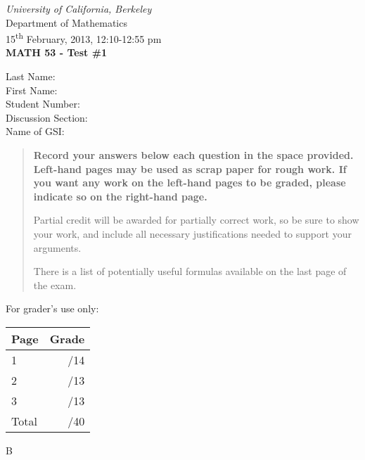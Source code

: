 \documentclass[12pt]{article}
\newcommand{\skipline}{\vspace{12pt}}
\begin{document}
\author{Instructor: Sean Fitzpatrick}
\thispagestyle{plain}
\begin{center}
\emph{University of California, Berkeley}\\
Department of Mathematics\\
15\textsuperscript{th} February, 2013, 12:10-12:55 pm\\
{\bf MATH 53 - Test \#1}\\
\end{center}
\skipline \skipline \skipline \noindent \skipline
Last Name:\underline{\hspace{350pt}}\\
\skipline
First Name:\underline{\hspace{348pt}}\\
\skipline
Student Number:\underline{\hspace{322pt}}\\
\skipline
Discussion Section: \underline{\hspace{307pt}}\\
\skipline
Name of GSI: \underline{\hspace{336pt}}\\

\vspace{0.5in}


\begin{quote}
 {\bf Record your answers below each question in the space provided.    Left-hand pages may be used as scrap paper for rough work.  If you want any work on the left-hand pages to be graded, please indicate so on the right-hand page.
 
 \bigskip
 
Partial credit will be awarded for partially correct work, so be sure to show your work, and include all necessary justifications needed to support your arguments. 

There is a list of potentially useful formulas available on the last page of the exam.}
\end{quote}


\vspace{0.5in}

For grader's use only:

\begin{table}[hbt]
\begin{center}
\begin{tabular}{|l|r|} \hline
Page&Grade\\
\hline \hline
\cline{1-2} 1 & \enspace\enspace\enspace\enspace\enspace\enspace/14\\
\cline{1-2} 2 & \enspace\enspace\enspace\enspace\enspace\enspace/13\\
\cline{1-2} 3 & \enspace\enspace\enspace\enspace\enspace\enspace/13\\
\cline{1-2} Total & \enspace\enspace\enspace\enspace\enspace\enspace/40\\
\hline
\end{tabular}

\skipline

\skipline

\skipline

B
\end{center}
\end{table}
\newpage
\end{document}
